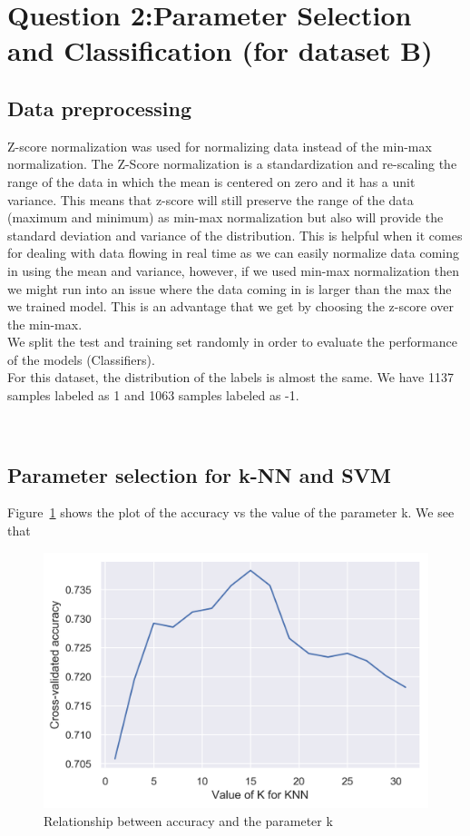 \section{Question 2:Parameter Selection and Classification (for dataset B)}
\subsection{Data preprocessing}
Z-score normalization was used for normalizing data instead of the min-max normalization. The Z-Score normalization is a standardization and re-scaling the range of the data in which the mean is centered on zero and it has a unit variance. This means that z-score will still preserve the range of the data (maximum and minimum) as min-max normalization but also will provide the standard deviation and variance of the distribution. This is helpful when it comes for dealing with data flowing in real time as we can easily normalize data coming in using the mean and variance, however, if we used min-max normalization then we might run into an issue where the data coming in is larger than the max the we trained model. This is an advantage that we get by choosing the z-score over the min-max. \\
We split the test and training set randomly in order to evaluate the performance of the models (Classifiers). \\
For this dataset, the distribution of the labels is almost the same. We have 1137 samples labeled as 1 and 1063 samples labeled as -1.


\\
\subsection{Parameter selection for k-NN and SVM}

Figure~\ref{fig:fig} shows the plot of the accuracy vs the value  of the parameter k. We see that 

\begin{figure}[!ht]
 \centering
\includegraphics[width=6.1in]{assignment2/2-2-a-kNN.png}
\caption{\label{fig:fig} Relationship between accuracy and the parameter k }
\end{figure}


